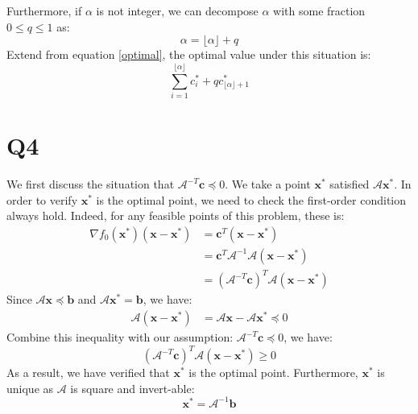 \documentclass[10pt,a4paper]{article}
\begin{document}
Furthermore, if $\alpha$ is not integer, we can decompose $\alpha$ with some fraction $0 \leq q \leq 1$ as:
\begin{equation*}
	\alpha = \lfloor \alpha \rfloor + q
\end{equation*}
Extend from equation \ref{optimal}, the optimal value under this situation is: 
\begin{equation}
	\displaystyle\sum_{i = 1}^{\lfloor \alpha \rfloor}c^{*}_{i} + q c^{*}_{\lfloor \alpha \rfloor + 1}
\end{equation}

\section*{Q4}
We first discuss the situation that $\mathcal{A}^{-T} \mathbf{c} \preceq 0$. We take a point $\mathbf{x}^{*}$ satisfied $\mathcal{A} \mathbf{x}^{*}$. In order to verify $\mathbf{x}^{*}$ is the optimal point, we need to check the first-order condition always hold. Indeed, for any feasible points of this problem, these is:
\begin{equation}
	\begin{aligned}
	\nabla f_{0}(\mathbf{x}^{*})(\mathbf{x} - \mathbf{x}^{*}) &= \mathbf{c}^{T}(\mathbf{x} - \mathbf{x}^{*}) \\
	&= \mathbf{c}^{T} \mathcal{A}^{-1} \mathcal{A} (\mathbf{x} - \mathbf{x}^{*}) \\
	&= (\mathcal{A}^{-T} \mathbf{c})^{T} \mathcal{A} (\mathbf{x} - \mathbf{x}^{*})
	\end{aligned}
\end{equation}
Since $\mathcal{A} \mathbf{x} \preceq \mathbf{b}$ and $\mathcal{A} \mathbf{x}^{*} = \mathbf{b}$, we have:
\begin{equation}
	\begin{aligned}
		\mathcal{A}(\mathbf{x} - \mathbf{x}^{*}) &= \mathcal{A} \mathbf{x} - \mathcal{A} \mathbf{x}^{*} \preceq 0
	\end{aligned}
\end{equation}
Combine this inequality with our assumption: $\mathcal{A}^{-T} \mathbf{c} \preceq 0$, we have:
\begin{equation}
	(\mathcal{A}^{-T} \mathbf{c})^{T} \mathcal{A} (\mathbf{x} - \mathbf{x}^{*}) \geq 0
\end{equation}
As a result, we have verified that $\mathbf{x}^{*}$ is the optimal point. Furthermore, $\mathbf{x}^{*}$ is unique as $\mathcal{A}$ is square and invert-able:
\begin{equation}
	\mathbf{x}^{*} = \mathcal{A}^{-1} \mathbf{b}
\end{equation}
\end{document}
